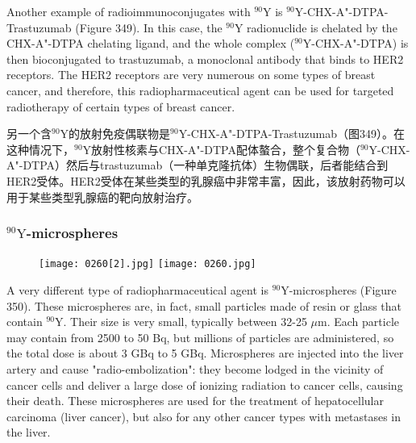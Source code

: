 \documentclass[dvipsnames, svgnames,a4paper,11pt]{article}
\begin{document}
Another example of radioimmunoconjugates with \(\mathrm{^{90}Y}\) is \(\mathrm{^{90}Y}\)-CHX-A"-DTPA-Trastuzumab (Figure 349). In this case, the \(\mathrm{^{90}Y}\) radionuclide is chelated by the CHX-A"-DTPA chelating ligand, and the whole complex (\(\mathrm{^{90}Y}\)-CHX-A"-DTPA) is then bioconjugated to trastuzumab, a monoclonal antibody that binds to HER2 receptors. The HER2 receptors are very numerous on some types of breast cancer, and therefore, this radiopharmaceutical agent can be used for targeted radiotherapy of certain types of breast cancer.

另一个含\(\mathrm{^{90}Y}\)的放射免疫偶联物是\(\mathrm{^{90}Y}\)-CHX-A"-DTPA-Trastuzumab（图349）。在这种情况下，\(\mathrm{^{90}Y}\)放射性核素与CHX-A"-DTPA配体螯合，整个复合物（\(\mathrm{^{90}Y}\)-CHX-A"-DTPA）然后与trastuzumab（一种单克隆抗体）生物偶联，后者能结合到HER2受体。HER2受体在某些类型的乳腺癌中非常丰富，因此，该放射药物可以用于某些类型乳腺癌的靶向放射治疗。

\subsubsection{\(\mathrm{^{90}Y}\)-microspheres}  

\begin{figure}[h]
    \centering
    \texttt{[image: 0260[2].jpg]}
    \hspace{0.2in}
    \texttt{[image: 0260.jpg]}
     \label{fig350}
\end{figure}

A very different type of radiopharmaceutical agent is \(\mathrm{^{90}Y}\)-microspheres (Figure 350). These microspheres are, in fact, small particles made of resin or glass that contain \(\mathrm{^{90}Y}\). Their size is very small, typically between 32-25 $\mu$m. Each particle may contain from 2500 to 50 Bq, but millions of particles are administered, so the total dose is about 3 GBq to 5 GBq. Microspheres are injected into the liver artery and cause "radio-embolization": they become lodged in the vicinity of cancer cells and deliver a large dose of ionizing radiation to cancer cells, causing their death. These microspheres are used for the treatment of hepatocellular carcinoma (liver cancer), but also for any other cancer types with metastases in the liver.
\end{document}
